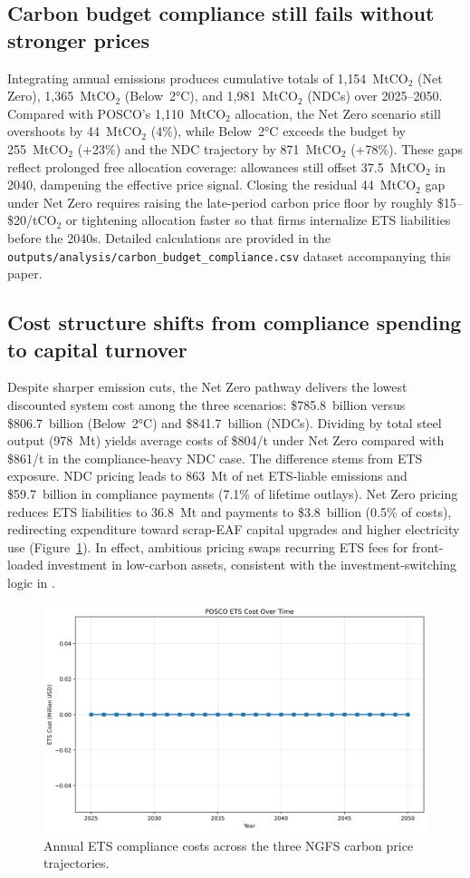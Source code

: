 \documentclass[preprint,1p,authoryear]{elsarticle}
\begin{document}
\subsection{Carbon budget compliance still fails without stronger prices}

Integrating annual emissions produces cumulative totals of 1{,}154~MtCO$_2$ (Net Zero), 1{,}365~MtCO$_2$ (Below~2°C), and 1{,}981~MtCO$_2$ (NDCs) over 2025--2050. Compared with POSCO's 1{,}110~MtCO$_2$ allocation, the Net Zero scenario still overshoots by 44~MtCO$_2$ (4\%), while Below~2°C exceeds the budget by 255~MtCO$_2$ (+23\%) and the NDC trajectory by 871~MtCO$_2$ (+78\%). These gaps reflect prolonged free allocation coverage: allowances still offset 37.5~MtCO$_2$ in 2040, dampening the effective price signal. Closing the residual 44~MtCO$_2$ gap under Net Zero requires raising the late-period carbon price floor by roughly \$15--\$20/tCO$_2$ or tightening allocation faster so that firms internalize ETS liabilities before the 2040s. Detailed calculations are provided in the \texttt{outputs/analysis/carbon\_budget\_compliance.csv} dataset accompanying this paper.

\subsection{Cost structure shifts from compliance spending to capital turnover}

Despite sharper emission cuts, the Net Zero pathway delivers the lowest discounted system cost among the three scenarios: \$785.8~billion versus \$806.7~billion (Below~2°C) and \$841.7~billion (NDCs). Dividing by total steel output (978~Mt) yields average costs of \$804/t under Net Zero compared with \$861/t in the compliance-heavy NDC case. The difference stems from ETS exposure. NDC pricing leads to 863~Mt of net ETS-liable emissions and \$59.7~billion in compliance payments (7.1\% of lifetime outlays). Net Zero pricing reduces ETS liabilities to 36.8~Mt and payments to \$3.8~billion (0.5\% of costs), redirecting expenditure toward scrap-EAF capital upgrades and higher electricity use (Figure~\ref{fig:ets-costs}). In effect, ambitious pricing swaps recurring ETS fees for front-loaded investment in low-carbon assets, consistent with the investment-switching logic in \citet{fowlie2016carbon}.

\begin{figure}[!t]
  \centering
  \includegraphics[width=0.8\linewidth]{ets_cost_by_scenario}
  \caption{Annual ETS compliance costs across the three NGFS carbon price trajectories.}
  \label{fig:ets-costs}
\end{figure}
\end{document}
